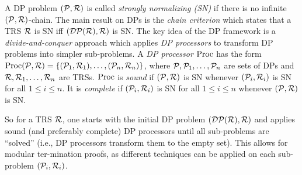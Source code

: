 A DP problem $(\mathcal{P}, \mathcal{R})$ is called
\emph{strongly normalizing (SN)} if there is no infinite $(\mathcal{P}, \mathcal{R})$-chain.
The main result on DPs is the \emph{chain criterion} which states that a TRS
$\mathcal{R}$ is SN iff $(\mathcal{DP}(\mathcal{R}), \mathcal{R})$ is SN.
The key idea of the DP framework is a \emph{divide-and-conquer} approach which
applies \emph{DP processors} to transform DP problems into simpler sub-problems.
A \emph{DP processor} $\operatorname{Proc}$ has the form $\operatorname{Proc}(\mathcal{P}, \mathcal{R}) = \{(\mathcal{P}_1,\mathcal{R}_1), \ldots, (\mathcal{P}_n,\mathcal{R}_n)\}$, 
where $\mathcal{P}, \mathcal{P}_1, \ldots, \mathcal{P}_n$ are sets of DPs and $\mathcal{R}, \mathcal{R}_1, \ldots, \mathcal{R}_n$ are TRSs. 
$\operatorname{Proc}$ is \emph{sound} if $(\mathcal{P}, \mathcal{R})$ is SN whenever 
$(\mathcal{P}_i,\mathcal{R}_i)$ is SN for all $1 \leq i \leq n$. 
It is \emph{complete} if $(\mathcal{P}_i,\mathcal{R}_i)$ is SN for all 
$1 \leq i \leq n$ whenever $(\mathcal{P}, \mathcal{R})$ is SN.


So for a TRS $\mathcal{R}$, one starts with the initial
DP problem $(\mathcal{DP}(\mathcal{R}), \mathcal{R})$ and applies sound 
(and preferably complete) DP processors until all sub-problems are ``solved'' (i.e.,
DP processors transform them to the empty set).
This allows for modular ter-\linebreak mination
proofs, as different techniques can be applied on each sub-problem $(\mathcal{P}_i, \mathcal{R}_i)$.

